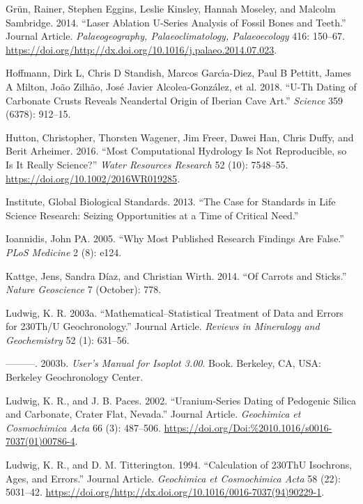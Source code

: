\documentclass[]{elsarticle} %
\begin{document}
\leavevmode\hypertarget{ref-Gruen2014}{}%
Grün, Rainer, Stephen Eggins, Leslie Kinsley, Hannah Moseley, and Malcolm Sambridge. 2014. ``Laser Ablation U-Series Analysis of Fossil Bones and Teeth.'' Journal Article. \emph{Palaeogeography, Palaeoclimatology, Palaeoecology} 416: 150--67. \url{https://doi.org/http://dx.doi.org/10.1016/j.palaeo.2014.07.023}.

\leavevmode\hypertarget{ref-hoffmann2018u}{}%
Hoffmann, Dirk L, Chris D Standish, Marcos Garcı́a-Diez, Paul B Pettitt, James A Milton, João Zilhão, José Javier Alcolea-González, et al. 2018. ``U-Th Dating of Carbonate Crusts Reveals Neandertal Origin of Iberian Cave Art.'' \emph{Science} 359 (6378): 912--15.

\leavevmode\hypertarget{ref-Hutton_et_al_2016}{}%
Hutton, Christopher, Thorsten Wagener, Jim Freer, Dawei Han, Chris Duffy, and Berit Arheimer. 2016. ``Most Computational Hydrology Is Not Reproducible, so Is It Really Science?'' \emph{Water Resources Research} 52 (10): 7548--55. \url{https://doi.org/10.1002/2016WR019285}.

\leavevmode\hypertarget{ref-global2013case}{}%
Institute, Global Biological Standards. 2013. ``The Case for Standards in Life Science Research: Seizing Opportunities at a Time of Critical Need.''

\leavevmode\hypertarget{ref-ioannidis2005most}{}%
Ioannidis, John PA. 2005. ``Why Most Published Research Findings Are False.'' \emph{PLoS Medicine} 2 (8): e124.

\leavevmode\hypertarget{ref-Kattge_Diaz_Wirth_2014}{}%
Kattge, Jens, Sandra Díaz, and Christian Wirth. 2014. ``Of Carrots and Sticks.'' \emph{Nature Geoscience} 7 (October): 778.

\leavevmode\hypertarget{ref-RN4370}{}%
Ludwig, K. R. 2003a. ``Mathematical--Statistical Treatment of Data and Errors for 230Th/U Geochronology.'' Journal Article. \emph{Reviews in Mineralogy and Geochemistry} 52 (1): 631--56.

\leavevmode\hypertarget{ref-RN2163}{}%
---------. 2003b. \emph{User's Manual for Isoplot 3.00}. Book. Berkeley, CA, USA: Berkeley Geochronology Center.

\leavevmode\hypertarget{ref-RN801}{}%
Ludwig, K. R., and J. B. Paces. 2002. ``Uranium-Series Dating of Pedogenic Silica and Carbonate, Crater Flat, Nevada.'' Journal Article. \emph{Geochimica et Cosmochimica Acta} 66 (3): 487--506. \url{https://doi.org/Doi:\%2010.1016/s0016-7037(01)00786-4}.

\leavevmode\hypertarget{ref-RN2155}{}%
Ludwig, K. R., and D. M. Titterington. 1994. ``Calculation of 230ThU Isochrons, Ages, and Errors.'' Journal Article. \emph{Geochimica et Cosmochimica Acta} 58 (22): 5031--42. \url{https://doi.org/http://dx.doi.org/10.1016/0016-7037(94)90229-1}.
\end{document}
